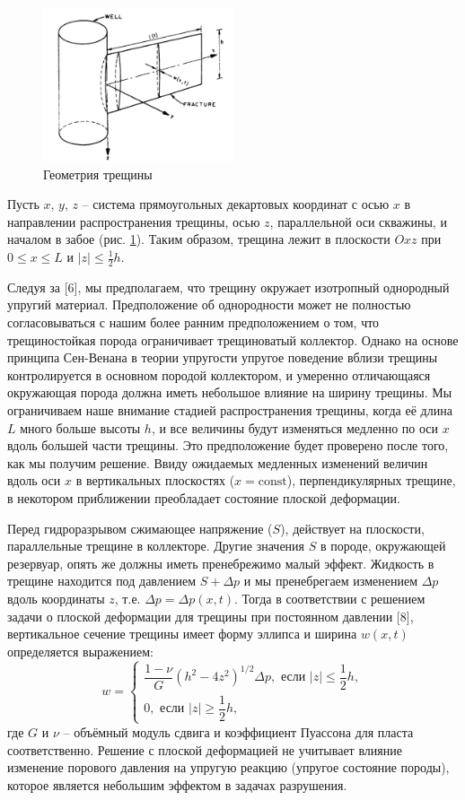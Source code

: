 \documentclass[a4paper, 11pt]{article}
\newcommand{\beq}{\begin{equation}}
\newcommand{\eeq}{\end{equation}}
\begin{document}
\begin{figure}[H]
\center
\includegraphics[width=0.5\textwidth]{fracture_geometry}
\caption{Геометрия трещины} 
\label{fig:kgd-model-geometry}  
\end{figure}

Пусть $x$, $y$, $z$ -- система прямоугольных декартовых координат с осью $x$ в направлении распространения трещины, осью $z$, параллельной оси скважины, и началом в забое (рис. \ref{fig:kgd-model-geometry}).
Таким образом, трещина лежит в плоскости $Oxz$ при $0\leqslant x\leqslant L$ и $|z|\leqslant \frac{1}{2}h$.

Следуя за [6], мы предполагаем, что трещину окружает изотропный однородный упругий материал.
Предположение об однородности может не полностью согласовываться с нашим более ранним предположением о том, что трещиностойкая порода ограничивает трещиноватый коллектор.
Однако на основе принципа Сен-Венана в теории упругости упругое поведение вблизи трещины контролируется в основном породой коллектором, и умеренно отличающаяся окружающая порода должна иметь небольшое влияние на ширину трещины.
Мы ограничиваем наше внимание стадией распространения трещины, когда её длина $L$ много больше высоты $h$, и все величины будут изменяться медленно по оси $x$ вдоль большей части трещины.
Это предположение будет проверено после того, как мы получим решение.
Ввиду ожидаемых медленных изменений величин вдоль оси $x$ в вертикальных плоскостях ($x=\textrm{const}$), перпендикулярных трещине, в некотором приближении преобладает состояние плоской деформации.

Перед гидроразрывом сжимающее напряжение ($S$), действует на плоскости, параллельные трещине в коллекторе.
Другие значения $S$ в породе, окружающей резервуар, опять же должны иметь пренебрежимо малый эффект.
Жидкость в трещине находится под давлением $S+\Delta p$ и мы пренебрегаем изменением $\Delta p$ вдоль координаты $z$, т.е. $\Delta p =\Delta p(x,t)$.
Тогда в соответствии с решением задачи о плоской деформации для трещины при постоянном давлении [8], вертикальное сечение трещины имеет форму эллипса и ширина $w(x,t)$ определяется выражением:
\beq\label{width}
w=
\begin{cases}
\dfrac{1-\nu}{G}\left(h^2-4z^2\right)^{1/2}\Delta p,\text{ если }|z|\leqslant\dfrac{1}{2}h,\\[10pt]
0,\text{ если }|z|\geqslant\dfrac{1}{2}h,
\end{cases}
\eeq
где $G$ и $\nu$ -- объёмный модуль сдвига и коэффициент Пуассона для пласта соответственно.
Решение с плоской деформацией не учитывает влияние изменение порового давления на упругую реакцию (упругое состояние породы), которое является небольшим эффектом в задачах разрушения.
\end{document}
